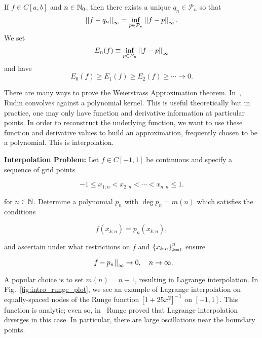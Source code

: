 \begin{thm}
If $f\in C[a,b]$ and $n\in\mathbb{N}_{0}$, then there exists
a unique $q_{n}\in\mathcal{P}_{n}$ so that
%
\begin{equation}
    \left| \left| f-q_{n} \right| \right|_{\infty} = \inf_{p\in\mathcal{P}_{n}}\left| \left| f-p \right| \right|_{\infty}.
\end{equation}
%
We set
%
\begin{equation}
    E_{n}(f) \equiv \inf_{p\in\mathcal{P}_{n}}\left| \left| f-p \right| \right|_{\infty}
\end{equation}
%
and have
%
\begin{equation}
    E_{0}(f)\ge E_{1}(f)\ge E_{2}(f) \ge \cdots \to 0.
\end{equation}
\end{thm}

There are many ways to prove the Weierstrass Approximation theorem.
In~\cite[Chapter 7]{baby_rudin}, Rudin convolves against a polynomial kernel.
This is useful theoretically but in practice, one may only
have function and derivative information at particular points.
In order to reconstruct the underlying function, we want to use
these function and derivative values to build an approximation,
frequently chosen to be a polynomial.
This is interpolation.

\textbf{Interpolation Problem:} Let $f\in C[-1,1]$ be continuous
and specify a sequence of grid points

\begin{equation}
    -1\le x_{1;n} < x_{2;n} < \cdots < x_{n;n}\le1.
\end{equation}

\noindent
for $n\in\mathbb{N}$.
Determine a polynomial $p_{n}$ with $\deg p_{n} = m(n)$
which satisfies the conditions

\begin{equation}
    f(x_{k;n}) = p_{n}(x_{k;n}),
\end{equation}

\noindent
and ascertain under what restrictions on $f$ and $\left\{ x_{k;n} \right\}_{k=1}^{n}$
ensure

\begin{equation}
    \left| \left| f-p_{n} \right| \right|_{\infty} \to0,\quad n\to\infty.
\end{equation}

A popular choice is to set $m(n) = n-1$, resulting in Lagrange
interpolation.
In Fig.~\ref{fig:intro_runge_plot}, we see an example of Lagrange
interpolation on equally-spaced nodes of the Runge function
$\left[ 1+25x^{2} \right]^{-1}$ on $[-1,1]$.
This function is analytic; even so, in~\cite{runge1901} Runge
proved that Lagrange interpolation diverges in this case.
In particular, there are large oscillations near the boundary points.

